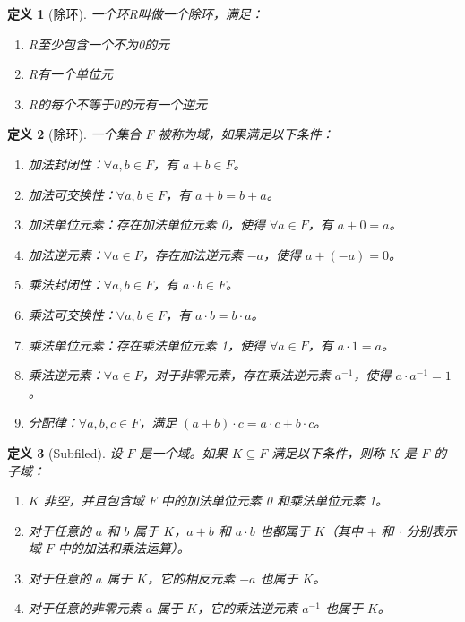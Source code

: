 \documentclass[11pt, a4paper, oneside,UTF8]{ctexbook}
\newtheorem{definition}{\indent 定义}[section]
\begin{document}
\begin{definition}[除环]
	一个环R叫做一个除环，满足：
	\begin{enumerate}
		\item R至少包含一个不为0的元
		\item R有一个单位元
		\item R的每个不等于0的元有一个逆元
	\end{enumerate}
\end{definition}
\begin{definition}[除环]


	一个集合 $F$ 被称为域，如果满足以下条件：
	\begin{enumerate}
		\item 加法封闭性：$\forall a, b \in F$，有 $a + b \in F$。
		\item 加法可交换性：$\forall a, b \in F$，有 $a + b = b + a$。
		\item 加法单位元素：存在加法单位元素 0，使得 $\forall a \in F$，有 $a + 0 = a$。
		\item 加法逆元素：$\forall a \in F$，存在加法逆元素 $-a$，使得 $a + (-a) = 0$。
		\item 乘法封闭性：$\forall a, b \in F$，有 $a \cdot b \in F$。
		\item 乘法可交换性：$\forall a, b \in F$，有 $a \cdot b = b \cdot a$。
		\item 乘法单位元素：存在乘法单位元素 1，使得 $\forall a \in F$，有 $a \cdot 1 = a$。
		\item 乘法逆元素：$\forall a \in F$，对于非零元素，存在乘法逆元素 $a^{-1}$，使得 $a \cdot a^{-1} = 1$。
		\item 分配律：$\forall a, b, c \in F$，满足 $(a + b) \cdot c = a \cdot c + b \cdot c$。
	\end{enumerate}

\end{definition}

\begin{definition}[Subfiled]

	设 $F$ 是一个域。如果 $K \subseteq F$ 满足以下条件，则称 $K$ 是 $F$ 的\emph{子域}：
	\begin{enumerate}
		\item $K$ 非空，并且包含域 $F$ 中的加法单位元素 0 和乘法单位元素 1。
		\item 对于任意的 $a$ 和 $b$ 属于 $K$，$a + b$ 和 $a \cdot b$ 也都属于 $K$（其中 $+$ 和 $\cdot$ 分别表示域 $F$ 中的加法和乘法运算）。
		\item 对于任意的 $a$ 属于 $K$，它的相反元素 $-a$ 也属于 $K$。
		\item 对于任意的非零元素 $a$ 属于 $K$，它的乘法逆元素 $a^{-1}$ 也属于 $K$。
	\end{enumerate}
\end{definition}
\end{document}
